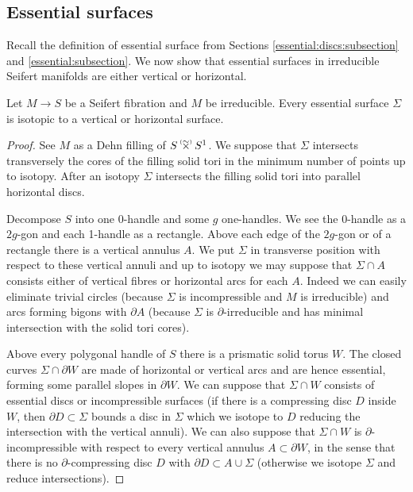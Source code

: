 \subsection{Essential surfaces}
Recall the definition of essential surface from Sections \ref{essential:discs:subsection} and \ref{essential:subsection}. We now show that essential surfaces in irreducible Seifert manifolds are either vertical or horizontal. 

\begin{prop} \label{v:h:prop}
Let $M\to S$ be a Seifert fibration and $M$ be irreducible. Every essential surface $\Sigma$ is isotopic to a vertical or horizontal surface.
\end{prop}
\begin{proof}
See $M$ as a Dehn filling of $S\timforsetil S^1$. We suppose that $\Sigma$ intersects transversely the cores of the filling solid tori in the minimum number of points up to isotopy. After an isotopy $\Sigma$ intersects the filling solid tori into parallel horizontal discs.

Decompose $S$ into one 0-handle and some $g$ one-handles. We see the 0-handle as a $2g$-gon and each 1-handle as a rectangle. Above each edge of the $2g$-gon or of a rectangle there is a vertical annulus $A$. We put $\Sigma$ in transverse position with respect to these vertical annuli and up to isotopy we may suppose that $\Sigma\cap A$ consists either of vertical fibres or horizontal arcs for each $A$. Indeed we can easily eliminate trivial circles (because $\Sigma$ is incompressible and $M$ is irreducible) and arcs forming bigons with $\partial A$ (because $\Sigma$ is $\partial$-irreducible and has minimal intersection with the solid tori cores).

Above every polygonal handle of $S$ there is a prismatic solid torus $W$. The closed curves $\Sigma \cap \partial W$ are made of horizontal or vertical arcs and are hence essential, forming some parallel slopes in $\partial W$. We can suppose that $\Sigma\cap W$ consists of essential discs or incompressible surfaces (if there is a compressing disc $D$ inside $W$, then $\partial D\subset \Sigma$ bounds a disc in $\Sigma$ which we isotope to $D$ reducing the intersection with the vertical annuli). 
We can also suppose that $\Sigma\cap W$ is $\partial$-incompressible with respect to every vertical annulus $A\subset \partial W$, in the sense that there is no $\partial$-compressing disc $D$ with $\partial D\subset A \cup \Sigma$ (otherwise we isotope $\Sigma$ and reduce intersections).


\end{proof}
